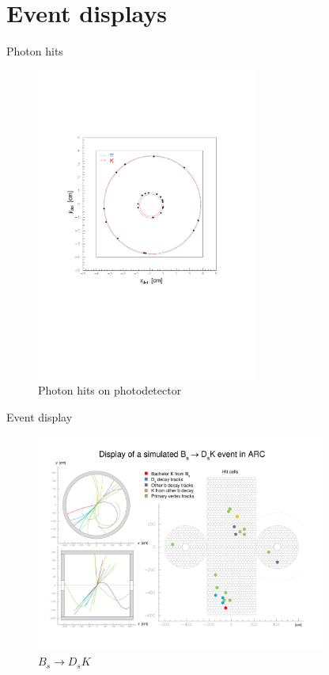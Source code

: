 \documentclass{beamer}
\begin{document}
\section{Event displays}
\begin{frame}{Photon hits}
  \begin{figure}
    \centering
    \includegraphics[width = 0.65\textwidth, trim = {2cm 9cm 3cm 6cm}, clip = true]{Plots/Display1.pdf}
    \caption{Photon hits on photodetector}
  \end{figure}
\end{frame}

\begin{frame}{Event display}
  \begin{figure}
    \centering
    \includegraphics[width = 0.85\textwidth, trim = {0cm 2cm 0cm 0cm}, clip = true]{Plots/Display2.pdf}
    \caption{$B_s\to D_sK$}
  \end{figure}
\end{frame}
\end{document}
